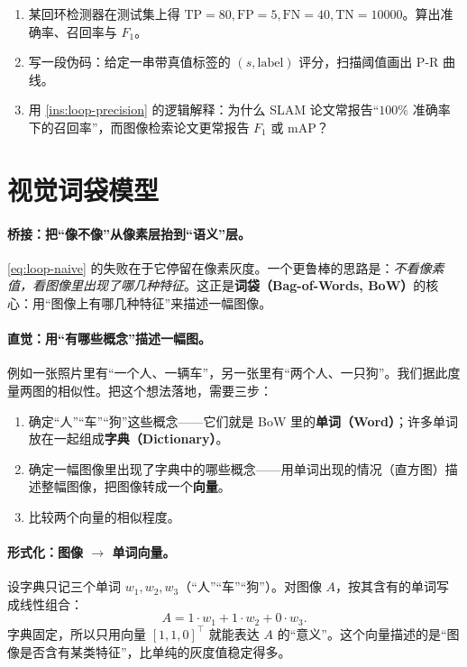 \begin{practice}
\begin{enumerate}
  \item 某回环检测器在测试集上得 $\mathrm{TP}=80,\mathrm{FP}=5,\mathrm{FN}=40,\mathrm{TN}=10000$。算出准确率、召回率与 $F_1$。
  \item 写一段伪码：给定一串带真值标签的 $(s,\text{label})$ 评分，扫描阈值画出 P-R 曲线。
  \item 用 \cref{ins:loop-precision} 的逻辑解释：为什么 SLAM 论文常报告“$100\%$ 准确率下的召回率”，而图像检索论文更常报告 $F_1$ 或 mAP？
\end{enumerate}
\end{practice}

\section{视觉词袋模型}
\label{sec:loop-bow}

\paragraph{桥接：把“像不像”从像素层抬到“语义”层。}
\cref{eq:loop-naive} 的失败在于它停留在像素灰度。一个更鲁棒的思路是：\emph{不看像素值，看图像里出现了哪几种特征}。这正是\textbf{词袋（Bag-of-Words, BoW）}的核心\cite{gaoxiang2019slam14}：用“图像上有哪几种特征”来描述一幅图像。

\paragraph{直觉：用“有哪些概念”描述一幅图。}
例如一张照片里有“一个人、一辆车”，另一张里有“两个人、一只狗”。我们据此度量两图的相似性。把这个想法落地，需要三步\cite{gaoxiang2019slam14}：
\begin{enumerate}
  \item 确定“人”“车”“狗”这些概念——它们就是 BoW 里的\textbf{单词（Word）}；许多单词放在一起组成\textbf{字典（Dictionary）}。
  \item 确定一幅图像里出现了字典中的哪些概念——用单词出现的情况（直方图）描述整幅图像，把图像转成一个\textbf{向量}。
  \item 比较两个向量的相似程度。
\end{enumerate}

\paragraph{形式化：图像 $\to$ 单词向量。}
设字典只记三个单词 $w_1,w_2,w_3$（“人”“车”“狗”）。对图像 $A$，按其含有的单词写成线性组合：
\begin{equation}
  A = 1\cdot w_1 + 1\cdot w_2 + 0\cdot w_3.
  \label{eq:loop-word-lincomb}
\end{equation}
字典固定，所以只用向量 $[1,1,0]^{\top}$ 就能表达 $A$ 的“意义”。这个向量描述的是“图像是否含有某类特征”，比单纯的灰度值稳定得多。

